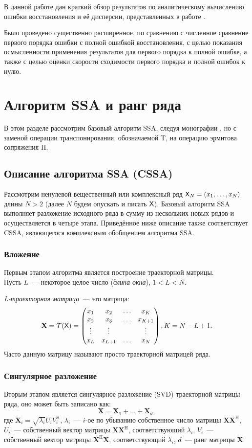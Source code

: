 \documentclass[specialist,
               substylefile = spbu.rtx,
               subf,href,colorlinks=true, 12pt]{disser}
\begin{document}
В данной работе дан краткий обзор результатов по аналитическому вычислению ошибки восстановления и её дисперсии, представленных в работе \cite{SenBach}.

Было проведено существенно расширенное, по сравнению с \cite{SenBach} численное сравнение первого порядка ошибки с полной ошибкой восстановления, с целью показания осмысленности применения результатов для первого порядка к полной ошибке, а также с целью оценки скорости сходимости первого порядка и полной ошибок к нулю.

\section{Алгоритм SSA и ранг ряда}
В этом разделе рассмотрим базовый алгоритм SSA, следуя монографии \cite{Golyandina.etal2001}, но с заменой операции транспонирования, обозначаемой $\mathrm{T}$, на операцию эрмитова сопряжения $\mathrm{H}$.
\subsection{Описание алгоритма SSA (CSSA)}
Рассмотрим ненулевой вещественный или комплексный ряд $\textsf{X}_N = (x_1, \ldots, x_{N})$ длины $N > 2$ (далее $N$ будем опускать и писать $\textsf{X}$). Базовый алгоритм SSA выполняет разложение исходного ряда в сумму из нескольких новых рядов и осуществляется в четыре этапа. Приведённое ниже описание также соответствует CSSA, являющегося комплексным обобщением алгоритма SSA.
\subsubsection{Вложение}
Первым этапом алгоритма является построение траекторной матрицы.\\
Пусть $L$~--- некоторое целое число (\textit{длина окна}), $1 < L < N$.

\textit{L-траекторная матрица}~--- это матрица:
$$\mathbf{X} = \mathcal{T}(\textsf{X}) = \begin{pmatrix}
           x_1 & x_2 & \ldots & x_{K}\\
           x_2 & x_3 & \ldots & x_{K+1}\\
           \vdots & \vdots & & \vdots\\
           x_{L} & x_{L+1} & \ldots & x_{N}
         \end{pmatrix}, K = N - L + 1.$$
Часто данную матрицу называют просто траекторной матрицей ряда.
\subsubsection{Сингулярное разложение}
Вторым этапом является сингулярное разложение (SVD) траекторной матрицы ряда, оно может быть записано как:
$$\mathbf{X} = \mathbf{X}_1 + \ldots + \mathbf{X}_d,$$
где $\mathbf{X}_i = \sqrt{\lambda_i}U_i V_i^\mathrm{H}$, $\lambda_i$~--- $i$-ое по убыванию собственное число матрицы $\mathbf{X} \mathbf{X}^{\mathrm{H}}$, $U_i$~--- собственный вектор матрицы $\mathbf{X} \mathbf{X}^{\mathrm{H}}$, соответствующий $\lambda_i$, $V_i$~--- собственный вектор матрицы $\mathbf{X}^{\mathrm{H}} \mathbf{X}$, соответствующий $\lambda_i$, $d$~--- ранг матрицы $\mathbf{X}$.
\end{document}
